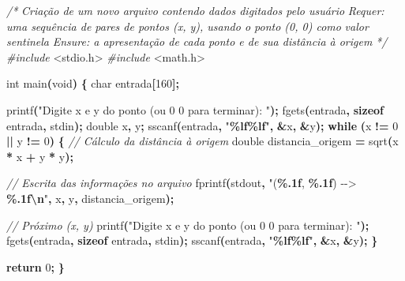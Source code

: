 \documentclass[
  11pt,
  a4paper,
]{scrbook}
\newenvironment{Shaded}{\begin{snugshade}}{\end{snugshade}}
\newcommand{\CommentTok}[1]{\textcolor[rgb]{0.56,0.35,0.01}{\textit{#1}}}
\newcommand{\ControlFlowTok}[1]{\textcolor[rgb]{0.13,0.29,0.53}{\textbf{#1}}}
\newcommand{\DataTypeTok}[1]{\textcolor[rgb]{0.13,0.29,0.53}{#1}}
\newcommand{\DecValTok}[1]{\textcolor[rgb]{0.00,0.00,0.81}{#1}}
\newcommand{\ImportTok}[1]{#1}
\newcommand{\KeywordTok}[1]{\textcolor[rgb]{0.13,0.29,0.53}{\textbf{#1}}}
\newcommand{\NormalTok}[1]{#1}
\newcommand{\OperatorTok}[1]{\textcolor[rgb]{0.81,0.36,0.00}{\textbf{#1}}}
\newcommand{\PreprocessorTok}[1]{\textcolor[rgb]{0.56,0.35,0.01}{\textit{#1}}}
\newcommand{\SpecialCharTok}[1]{\textcolor[rgb]{0.81,0.36,0.00}{\textbf{#1}}}
\newcommand{\StringTok}[1]{\textcolor[rgb]{0.31,0.60,0.02}{#1}}
\begin{document}
\begin{Shaded}
\begin{Highlighting}[]
\CommentTok{/*}
\CommentTok{Criação de um novo arquivo contendo dados digitados pelo usuário}
\CommentTok{Requer: uma sequência de pares de pontos (x, y), usando o ponto (0, 0) como}
\CommentTok{    valor sentinela}
\CommentTok{Ensure: a apresentação de cada ponto e de sua distância à origem}
\CommentTok{*/}
\PreprocessorTok{\#include }\ImportTok{\textless{}stdio.h\textgreater{}}
\PreprocessorTok{\#include }\ImportTok{\textless{}math.h\textgreater{}}

\DataTypeTok{int}\NormalTok{ main}\OperatorTok{(}\DataTypeTok{void}\OperatorTok{)} \OperatorTok{\{}
    \DataTypeTok{char}\NormalTok{ entrada}\OperatorTok{[}\DecValTok{160}\OperatorTok{];}

\NormalTok{    printf}\OperatorTok{(}\StringTok{"Digite x e y do ponto (ou 0 0  para terminar): "}\OperatorTok{);}
\NormalTok{    fgets}\OperatorTok{(}\NormalTok{entrada}\OperatorTok{,} \KeywordTok{sizeof}\NormalTok{ entrada}\OperatorTok{,}\NormalTok{ stdin}\OperatorTok{);}
    \DataTypeTok{double}\NormalTok{ x}\OperatorTok{,}\NormalTok{ y}\OperatorTok{;}
\NormalTok{    sscanf}\OperatorTok{(}\NormalTok{entrada}\OperatorTok{,} \StringTok{"}\SpecialCharTok{\%lf\%lf}\StringTok{"}\OperatorTok{,} \OperatorTok{\&}\NormalTok{x}\OperatorTok{,} \OperatorTok{\&}\NormalTok{y}\OperatorTok{);}
    \ControlFlowTok{while} \OperatorTok{(}\NormalTok{x }\OperatorTok{!=} \DecValTok{0} \OperatorTok{||}\NormalTok{ y }\OperatorTok{!=} \DecValTok{0}\OperatorTok{)} \OperatorTok{\{}
        \CommentTok{// Cálculo da distância à origem}
        \DataTypeTok{double}\NormalTok{ distancia\_origem }\OperatorTok{=}\NormalTok{ sqrt}\OperatorTok{(}\NormalTok{x }\OperatorTok{*}\NormalTok{ x }\OperatorTok{+}\NormalTok{ y }\OperatorTok{*}\NormalTok{ y}\OperatorTok{);}

        \CommentTok{// Escrita das informações no arquivo}
\NormalTok{        fprintf}\OperatorTok{(}\NormalTok{stdout}\OperatorTok{,} \StringTok{"(}\SpecialCharTok{\%.1f}\StringTok{, }\SpecialCharTok{\%.1f}\StringTok{) {-}{-}\textgreater{} }\SpecialCharTok{\%.1f\textbackslash{}n}\StringTok{"}\OperatorTok{,}\NormalTok{ x}\OperatorTok{,}\NormalTok{ y}\OperatorTok{,}\NormalTok{ distancia\_origem}\OperatorTok{);}

        \CommentTok{// Próximo (x, y)}
\NormalTok{        printf}\OperatorTok{(}\StringTok{"Digite x e y do ponto (ou 0 0  para terminar): "}\OperatorTok{);}
\NormalTok{        fgets}\OperatorTok{(}\NormalTok{entrada}\OperatorTok{,} \KeywordTok{sizeof}\NormalTok{ entrada}\OperatorTok{,}\NormalTok{ stdin}\OperatorTok{);}
\NormalTok{        sscanf}\OperatorTok{(}\NormalTok{entrada}\OperatorTok{,} \StringTok{"}\SpecialCharTok{\%lf\%lf}\StringTok{"}\OperatorTok{,} \OperatorTok{\&}\NormalTok{x}\OperatorTok{,} \OperatorTok{\&}\NormalTok{y}\OperatorTok{);}
    \OperatorTok{\}}

    \ControlFlowTok{return} \DecValTok{0}\OperatorTok{;}
\OperatorTok{\}}
\end{Highlighting}
\end{Shaded}
\end{document}
